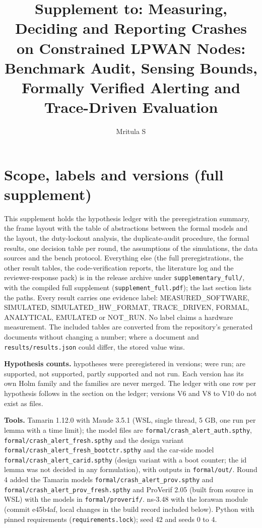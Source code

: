 \documentclass[10pt,a4paper]{article}
\title{Supplement to: Measuring, Deciding and Reporting Crashes on Constrained LPWAN Nodes: Benchmark Audit, Sensing Bounds, Formally Verified Alerting and Trace-Driven Evaluation}
\author{Mritula S}
\date{}
\begin{document}
\maketitle
\tableofcontents

\section{Scope, labels and versions (full supplement)}
This supplement holds the hypothesis ledger with the preregistration summary, the frame layout with the table of abstractions between the formal models and the layout, the duty-lockout analysis, the duplicate-audit procedure, the formal results, one decision table per round, the assumptions of the simulations, the data sources and the bench protocol. Everything else (the full preregistrations, the other result tables, the code-verification reports, the literature log and the reviewer-response pack) is in the release archive under \texttt{supplementary\_full/}, with the compiled full supplement (\texttt{supplement\_full.pdf}); the last section lists the paths. Every result carries one evidence label: MEASURED\_SOFTWARE, SIMULATED, SIMULATED\_HW\_FORMAT, TRACE\_DRIVEN, FORMAL, ANALYTICAL, EMULATED or NOT\_RUN. No label claims a hardware measurement. The included tables are converted from the repository's generated documents without changing a number; where a document and \texttt{results/results.json} could differ, the stored value wins.

\textbf{Hypothesis counts.} \LedgerN{} hypotheses were preregistered in \LedgerVersions{} versions; \LedgerRun{} were run; \LedgerSupp{} are supported, \LedgerNot{} not supported, \LedgerPartly{} partly supported and \LedgerNotRun{} not run. Each version has its own Holm family and the families are never merged. The ledger with one row per hypothesis follows in the section on the ledger; versions V6 and V8 to V10 do not exist as files.

\textbf{Tools.} Tamarin 1.12.0 with Maude 3.5.1 (WSL, single thread, 5 GB, one run per lemma with a time limit); the model files are \texttt{formal/crash\_alert\_auth.spthy}, \texttt{formal/crash\_alert\_fresh.spthy} and the design variant \texttt{formal/crash\_alert\_fresh\_bootctr.spthy} and the car-side model \texttt{formal/crash\_alert\_carid.spthy} (design variant with a boot counter; the id lemma was not decided in any formulation), with outputs in \texttt{formal/out/}. Round 4 added the Tamarin models \texttt{formal/crash\_alert\_prov.spthy} and \texttt{formal/crash\_alert\_prov\_fresh.spthy} and ProVerif 2.05 (built from source in WSL) with the models in \texttt{formal/proverif/}. ns-3.48 with the lorawan module (commit e45b4af, local changes in the build record included below). Python with pinned requirements (\texttt{requirements.lock}); seed 42 and seeds 0 to 4.
\end{document}
